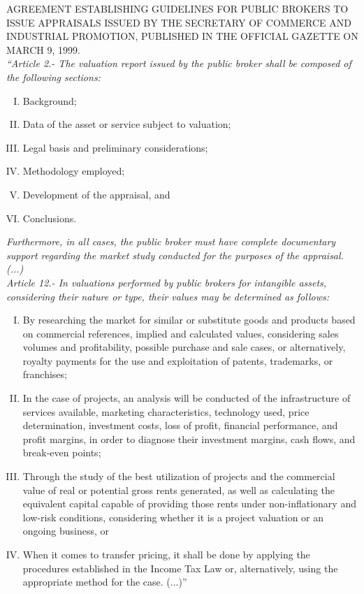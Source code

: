 \textcolor{principal}{AGREEMENT ESTABLISHING GUIDELINES FOR PUBLIC BROKERS TO ISSUE APPRAISALS ISSUED BY THE SECRETARY OF COMMERCE AND INDUSTRIAL PROMOTION, PUBLISHED IN THE OFFICIAL GAZETTE ON MARCH 9, 1999.}\\[10pt]



\textit{``Article 2.- The valuation report issued by the public broker shall be composed of the following sections:}

\begin{enumerate}[I.]

\item Background;
\item Data of the asset or service subject to valuation; 
\item Legal basis and preliminary considerations; 
\item  Methodology employed;
\item  Development of the appraisal, and
\item  Conclusions.

\end{enumerate}

\textit{Furthermore, in all cases, the public broker must have complete documentary support regarding the market study conducted for the purposes of the appraisal. (...)}\\[10pt]

\textit{Article 12.- In valuations performed by public brokers for intangible assets, considering their nature or type, their values may be determined as follows:}

\begin{enumerate}[I.-]
\item By researching the market for similar or substitute goods and products based on commercial references, implied and calculated values, considering sales volumes and profitability, possible purchase and sale cases, or alternatively, royalty payments for the use and exploitation of patents, trademarks, or franchises;

\item In the case of projects, an analysis will be conducted of the infrastructure of services available, marketing characteristics, technology used, price determination, investment costs, loss of profit, financial performance, and profit margins, in order to diagnose their investment margins, cash flows, and break-even points;

\item Through the study of the best utilization of projects and the commercial value of real or potential gross rents generated, as well as calculating the equivalent capital capable of providing those rents under non-inflationary and low-risk conditions, considering whether it is a project valuation or an ongoing business, or

\item When it comes to transfer pricing, it shall be done by applying the procedures established in the Income Tax Law or, alternatively, using the appropriate method for the case. (...)''

\end{enumerate}